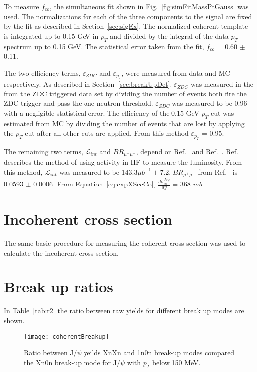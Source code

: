  To measure $f_{co}$, the simultaneous fit shown in 
    Fig.~\ref{fig:simFitMassPtGauss} was used.
  The normalizations for each of the three components to the signal are fixed 
  by the fit as described in Section~\ref{sec:sigEx}.
  The normalized coherent template is integrated up to 0.15 GeV in $p_{T}$ and
    divided by the integral of the data $p_{T}$ spectrum up to 0.15 GeV.
  The statistical error taken from the fit, $f_{co}$ = 0.60 $\pm$ 0.11.

  The two efficiency terms, $\varepsilon_{ZDC}$ and $\varepsilon_{p_{T}}$, were
    measured from data and MC respectively.
  As described in Section~\ref{sec:breakUpDet}, $\varepsilon_{ZDC}$ was 
    measured in the from the ZDC triggered data set by dividing the number of 
    events both fire the ZDC trigger and pass the one neutron threshold.
  $\varepsilon_{ZDC}$ was measured to be 0.96 with a negligible statistical 
    error.
  The efficiency of the 0.15 GeV $p_{T}$ cut was estimated from MC by dividing 
    the number of events that are lost by applying the $p_{T}$ cut after all
    other cuts are applied. 
  From this method $\varepsilon_{p_{T}}$ = 0.95.
  
  The remaining two terms, $\mathcal{L}_{int}$ and $BR_{\mu^{+}\mu^{-}}$, 
    depend on Ref.~\cite{cmsLumi} and Ref.~\cite{pdg}.
  Ref.~\cite{cmsLumi} describes the method of using activity in HF to measure 
    the luminosity. 
  From this method, $\mathcal{L}_{int}$ was measured to be 143.3$\mu b^{-1}\pm$7.2.
  $BR_{\mu^{+}\mu^{-}}$ from Ref.~\cite{pdg} is 0.0593 $\pm$ 0.0006.
  From Equation~\ref{eq:expXSecCo}, $\frac{d\sigma^{J/\psi}_{co}}{dy}$ = 368 $mb$.

  \section{Incoherent cross section}
  The same basic procedure for measuring the coherent cross section was used to 
    calculate the incoherent cross section.  
  \section{Break up ratios}
    In Table~\ref{tab:r2} the ratio between raw yields for different break up 
      modes are shown.
    \begin{figure}[!Hhtb]
      \centering
      \texttt{[image: coherentBreakup]}
      \caption{Ratio between J/$\psi$ yeilds XnXn and 1n0n break-up modes 
        compared the Xn0n break-up mode for J/$\psi$ with $p_{T}$ below 150 
        MeV.}
      \label{fig:coherentBreakUp}
    \end{figure}
   
